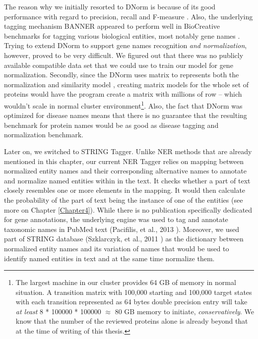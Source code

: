 The reason why we initially resorted to DNorm is because of its good performance with regard to precision, recall and F-measure \citep{leaman2013dnorm}. Also, the underlying tagging mechanism BANNER appeared to perform well in BioCreative benchmarks for tagging various biological entities, most notably gene names \citep{smith2008overview} \citep{leaman2008banner}. Trying to extend DNorm to support gene names recognition \textit{and normalization}, however, proved to be very difficult. We figured out that there was no publicly available compatible data set that we could use to train our model for gene normalization. Secondly, since the DNorm uses matrix to represents both the normalization and similarity model \citep{leaman2013dnorm}, creating matrix models for the whole set of proteins would have the program create a matrix with millions of row -- which wouldn't scale in normal cluster environment\footnote{The largest machine in our cluster provides 64 GB of memory in normal situation. A transition matrix with 100,000 starting and 100,000 target states with each transition represented as 64 bytes double precision entry will take \textit{at least} 8 * 100000 * 100000 $\approx$ 80 GB memory to initiate, \textit{conservatively}. We know that the number of the reviewed proteins alone is already beyond that at the time of writing of this thesis.}. Also, the fact that DNorm was optimized for disease names means that there is no guarantee that the resulting benchmark for protein names would be as good as disease tagging and normalization benchmark.

Later on, we switched to STRING Tagger. Unlike NER methods that are already mentioned in this chapter, our current NER Tagger relies on mapping between normalized entity names and their corresponding alternative names to annotate and normalize named entities within in the text. It checks whether a part of text closely resembles one or more elements in the mapping. It would then calculate the probability of the part of text being the instance of one of the entities (see more on Chapter \ref{Chapter4}). While there is no publication specifically dedicated for gene annotations, the underlying engine was used to tag and annotate taxonomic names in PubMed text (Pacifilis, et al., 2013 \citep{pafilis2013species}). Moreover, we used part of STRING database (Szklarczyk, et al., 2011 \citep{szklarczyk2011string}) as the dictionary between normalized entity names and its variation of names that would be used to identify named entities in text and at the same time normalize them.


